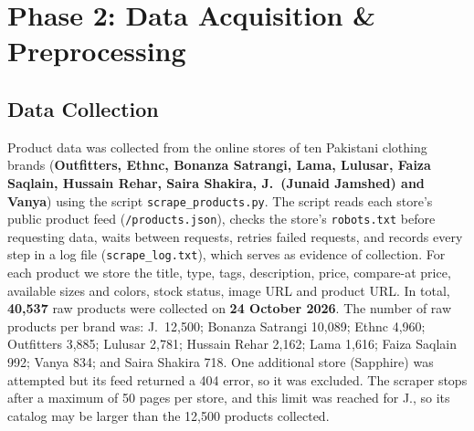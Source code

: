 \section{Phase 2: Data Acquisition \& Preprocessing}

\subsection{Data Collection}
Product data was collected from the online stores of ten Pakistani clothing brands (\textbf{Outfitters, Ethnc, Bonanza Satrangi, Lama, Lulusar, Faiza Saqlain, Hussain Rehar, Saira Shakira, J.\ (Junaid Jamshed) and Vanya}) using the script \texttt{scrape\_products.py}. The script reads each store's public product feed (\texttt{/products.json}), checks the store's \texttt{robots.txt} before requesting data, waits between requests, retries failed requests, and records every step in a log file (\texttt{scrape\_log.txt}), which serves as evidence of collection. For each product we store the title, type, tags, description, price, compare-at price, available sizes and colors, stock status, image URL and product URL. In total, \textbf{40,537} raw products were collected on \textbf{24 October 2026}. The number of raw products per brand was: J.\ 12,500; Bonanza Satrangi 10,089; Ethnc 4,960; Outfitters 3,885; Lulusar 2,781; Hussain Rehar 2,162; Lama 1,616; Faiza Saqlain 992; Vanya 834; and Saira Shakira 718. One additional store (Sapphire) was attempted but its feed returned a 404 error, so it was excluded. The scraper stops after a maximum of 50 pages per store, and this limit was reached for J., so its catalog may be larger than the 12,500 products collected.

